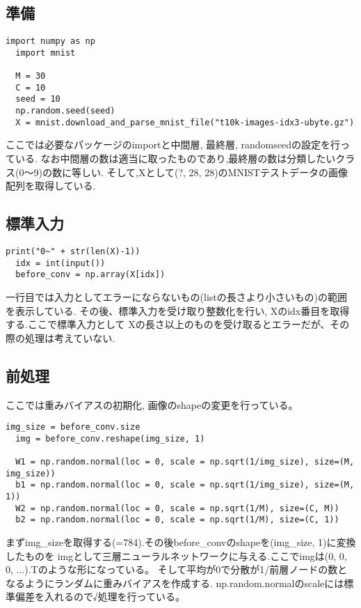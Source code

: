 \documentclass[a4paper,11pt]{jsarticle}
\begin{document}
\subsection{準備}
\begin{lstlisting}[caption=preparation]
  import numpy as np
  import mnist

  M = 30
  C = 10
  seed = 10
  np.random.seed(seed)
  X = mnist.download_and_parse_mnist_file("t10k-images-idx3-ubyte.gz")
\end{lstlisting}
\par
ここでは必要なパッケージのimportと中間層, 最終層, randomseedの設定を行っている.
なお中間層の数は適当に取ったものであり,最終層の数は分類したいクラス(0～9)の数に等しい.
そして,Xとして(?, 28, 28)のMNISTテストデータの画像配列を取得している.

\subsection{標準入力}
\begin{lstlisting}[caption=stdin]
  print("0~" + str(len(X)-1))
  idx = int(input())
  before_conv = np.array(X[idx])
\end{lstlisting}
\par
一行目では入力としてエラーにならないもの(listの長さより小さいもの)の範囲を表示している.
その後、標準入力を受け取り整数化を行い, Xのidx番目を取得する.ここで標準入力として
Xの長さ以上のものを受け取るとエラーだが、その際の処理は考えていない.

\subsection{前処理}
ここでは重みバイアスの初期化, 画像のshapeの変更を行っている。
\begin{lstlisting}[caption=pre-processing]
  img_size = before_conv.size
  img = before_conv.reshape(img_size, 1)

  W1 = np.random.normal(loc = 0, scale = np.sqrt(1/img_size), size=(M, img_size))
  b1 = np.random.normal(loc = 0, scale = np.sqrt(1/img_size), size=(M, 1))
  W2 = np.random.normal(loc = 0, scale = np.sqrt(1/M), size=(C, M))
  b2 = np.random.normal(loc = 0, scale = np.sqrt(1/M), size=(C, 1))
\end{lstlisting}
\par
まずimg\_sizeを取得する(=784).その後before\_convのshapeを(img\_size, 1)に変換したものを
imgとして三層ニューラルネットワークに与える.ここでimgは(0, 0, 0, ...).Tのような形になっている。
そして平均が0で分散が1/前層ノードの数となるようにランダムに重みバイアスを作成する.
np.random.normalのscaleには標準偏差を入れるので√処理を行っている。
\end{document}
